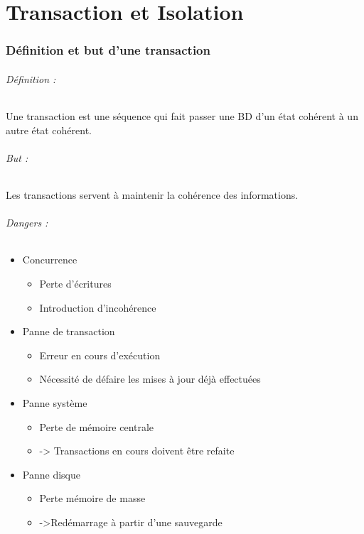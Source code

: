 \documentclass[10pt,a4paper,twoside]{article}
\begin{document}
\newpage
\part{Transaction et Isolation}

\section{Définition et but d'une transaction}
\paragraph{Définition :} Une transaction est une séquence qui fait passer une BD d'un état cohérent à un autre état cohérent.

\paragraph{But : } Les transactions servent à maintenir la cohérence des informations.

\paragraph{Dangers :}
\begin{itemize}
\item Concurrence
\begin{itemize}
\item Perte d'écritures
\item Introduction d'incohérence
\end{itemize}
\item Panne de transaction 
\begin{itemize}
\item Erreur en cours d'exécution
\item Nécessité de défaire les mises à jour déjà effectuées
\end{itemize}
\item Panne système
\begin{itemize}
\item Perte de mémoire centrale
\item -> Transactions en cours doivent être refaite
\end{itemize}
\item Panne disque
\begin{itemize}
\item Perte mémoire de masse
\item ->Redémarrage à partir d'une sauvegarde
\end{itemize}
\end{itemize}
\end{document}
